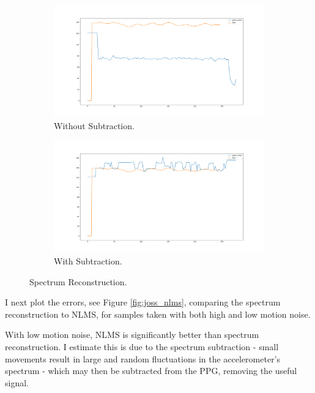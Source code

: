 \documentclass[12pt,a4paper,twoside,openright]{report}
\begin{document}
\begin{figure}[h]
\begin{subfigure}{.5\textwidth}
  \centering
  \includegraphics[width=\linewidth]{figs/joss_nosub.png}
  \caption{Without Subtraction.}
  \label{fig:joss_nosub}
\end{subfigure}%
\begin{subfigure}{.5\textwidth}
  \centering
  \includegraphics[width=\linewidth]{figs/joss_sub.png}
  \caption{With Subtraction.}
  \label{fig:joss_sub}
\end{subfigure}
\caption{Spectrum Reconstruction.}
\label{fig:joss_eg}
\end{figure}

I next plot the errors, see Figure \ref{fig:joss_nlms}, comparing the spectrum
reconstruction to NLMS, for samples taken with both high and low motion noise. 

With low motion noise, NLMS is significantly better than spectrum
reconstruction. I estimate this is due to the spectrum subtraction - small
movements result in large and random fluctuations in the accelerometer's
spectrum - which may then be subtracted from the PPG, removing the useful
signal. 
\end{document}

